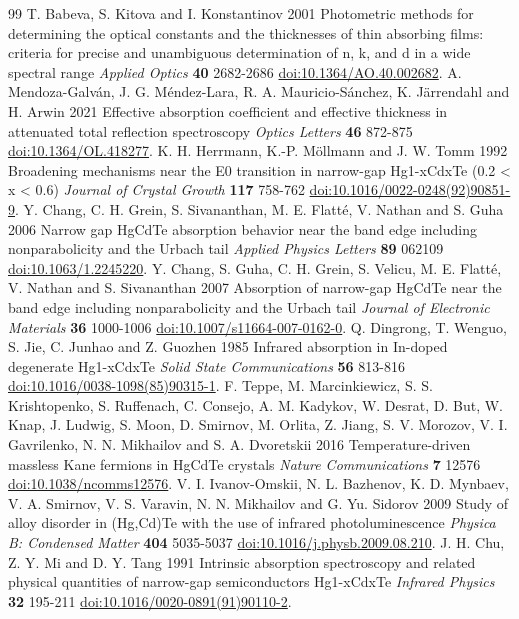 \documentclass[12pt]{article}
\begin{document}
\begin{thebibliography}{99}
 T. Babeva, S. Kitova and I. Konstantinov 2001 Photometric methods for determining the optical constants and the thicknesses of thin absorbing films: criteria for precise and unambiguous determination of n, k, and d in a wide spectral range \textit{Applied Optics} \textbf{40} 2682-2686 \href{https://doi.org/10.1364/AO.40.002682}{doi:10.1364/AO.40.002682}.
 A. Mendoza-Galván, J. G. Méndez-Lara, R. A. Mauricio-Sánchez, K. Järrendahl and H. Arwin 2021 Effective absorption coefficient and effective thickness in attenuated total reflection spectroscopy \textit{Optics Letters} \textbf{46} 872-875 \href{https://doi.org/10.1364/OL.418277}{doi:10.1364/OL.418277}.
 K. H. Herrmann, K.-P. Möllmann and J. W. Tomm 1992 Broadening mechanisms near the E0 transition in narrow-gap Hg1-xCdxTe (0.2 < x < 0.6) \textit{Journal of Crystal Growth} \textbf{117} 758-762 \href{https://doi.org/10.1016/0022-0248(92)90851-9}{doi:10.1016/0022-0248(92)90851-9}.
 Y. Chang, C. H. Grein, S. Sivananthan, M. E. Flatté, V. Nathan and S. Guha 2006 Narrow gap HgCdTe absorption behavior near the band edge including nonparabolicity and the Urbach tail \textit{Applied Physics Letters} \textbf{89} 062109 \href{https://doi.org/10.1063/1.2245220}{doi:10.1063/1.2245220}.
 Y. Chang, S. Guha, C. H. Grein, S. Velicu, M. E. Flatté, V. Nathan and S. Sivananthan 2007 Absorption of narrow-gap HgCdTe near the band edge including nonparabolicity and the Urbach tail \textit{Journal of Electronic Materials} \textbf{36} 1000-1006 \href{https://doi.org/10.1007/s11664-007-0162-0}{doi:10.1007/s11664-007-0162-0}.
 Q. Dingrong, T. Wenguo, S. Jie, C. Junhao and Z. Guozhen 1985 Infrared absorption in In-doped degenerate Hg1-xCdxTe \textit{Solid State Communications} \textbf{56} 813-816 \href{https://doi.org/10.1016/0038-1098(85)90315-1}{doi:10.1016/0038-1098(85)90315-1}.
 F. Teppe, M. Marcinkiewicz, S. S. Krishtopenko, S. Ruffenach, C. Consejo, A. M. Kadykov, W. Desrat, D. But, W. Knap, J. Ludwig, S. Moon, D. Smirnov, M. Orlita, Z. Jiang, S. V. Morozov, V. I. Gavrilenko, N. N. Mikhailov and S. A. Dvoretskii 2016 Temperature-driven massless Kane fermions in HgCdTe crystals \textit{Nature Communications} \textbf{7} 12576 \href{https://doi.org/10.1038/ncomms12576}{doi:10.1038/ncomms12576}.
 V. I. Ivanov-Omskii, N. L. Bazhenov, K. D. Mynbaev, V. A. Smirnov, V. S. Varavin, N. N. Mikhailov and G. Yu. Sidorov 2009 Study of alloy disorder in (Hg,Cd)Te with the use of infrared photoluminescence \textit{Physica B: Condensed Matter} \textbf{404} 5035-5037 \href{https://doi.org/10.1016/j.physb.2009.08.210}{doi:10.1016/j.physb.2009.08.210}.
 J. H. Chu, Z. Y. Mi and D. Y. Tang 1991 Intrinsic absorption spectroscopy and related physical quantities of narrow-gap semiconductors Hg1-xCdxTe \textit{Infrared Physics} \textbf{32} 195-211 \href{https://doi.org/10.1016/0020-0891(91)90110-2}{doi:10.1016/0020-0891(91)90110-2}.
\end{thebibliography}
\end{document}
